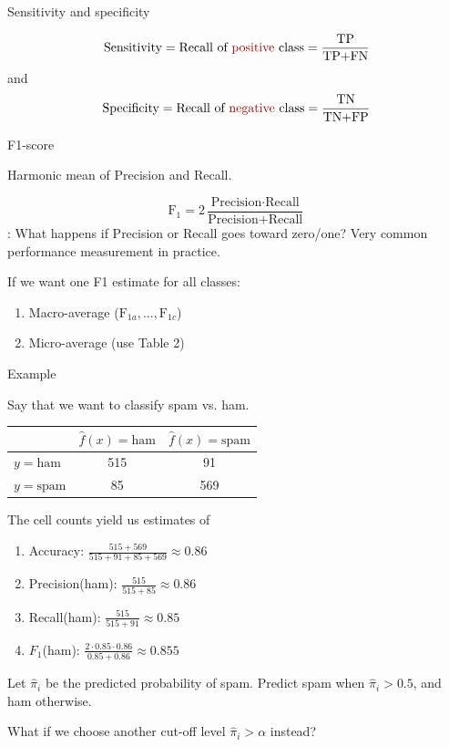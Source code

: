 \documentclass[10pt]{beamer}
\begin{document}
\begin{frame}{Sensitivity and specificity}

\[
\text{Sensitivity} = \text{Recall of \uured{positive} class} =  \frac{\text{TP}}{\text{TP+FN}}
\]
and
\[
\text{Specificity} = \text{Recall of \uured{negative} class} =\frac{\text{TN}}{\text{TN+FP}}
\]

\end{frame}


\begin{frame}{F1-score}

Harmonic mean of Precision and Recall.

\[
\text{F}_1 = 2\frac{\text{Precision}\cdot\text{Recall}}{\text{Precision}+\text{Recall}}
\]
: What happens if Precision or Recall goes toward zero/one?
\pause
Very common performance measurement in practice.

If we want one F1 estimate for all classes:
\begin{enumerate}
\item Macro-average ($\text{F}_{1a}, ..., \text{F}_{1c}$)
\item Micro-average (use Table 2)
\end{enumerate}

\end{frame}



\begin{frame}{Example}

Say that we want to classify spam vs. ham. \\[3mm]\pause

\begin{center}
\begin{tabular}{ l | c | c }
  & $\hat{f}(x)=\text{ham}$ & $\hat{f}(x)=\text{spam}$\\
  \hline
  $y=\text{ham}$ & 515 & 91 \\
  $y=\text{spam}$ & 85 & 569 \\
  \hline
\end{tabular}
\end{center}
The cell counts yield us estimates of
\begin{enumerate}
\item Accuracy: $\frac{515+569}{515+91+85+569}\approx 0.86$
\item Precision(ham): $\frac{515}{515+85}\approx 0.86$
\item Recall(ham): $\frac{515}{515+91}\approx 0.85$
\item $F_1$(ham): $\frac{2 \cdot 0.85 \cdot 0.86}{0.85 + 0.86}\approx 0.855$
\end{enumerate}

\pause

Let $\hat{\pi}_i$ be the predicted probability of spam. Predict spam when $\hat{\pi}_i>0.5$, and ham otherwise.

What if we choose another cut-off level $\hat{\pi}_i>\alpha$ instead?

\end{frame}
\end{document}
